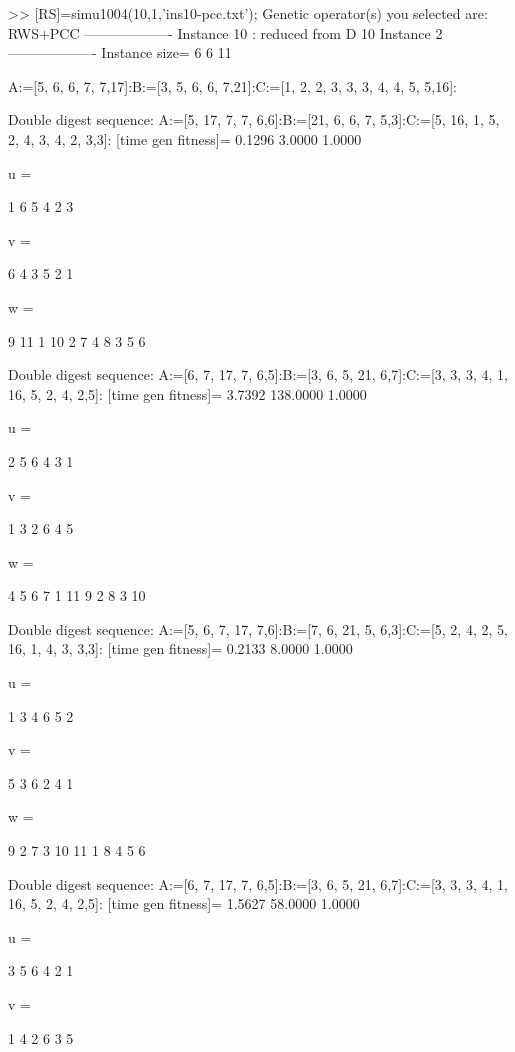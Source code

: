 >> [RS]=simu1004(10,1,'ins10-pcc.txt');
Genetic operator(s) you selected are:
RWS+PCC
------------------- Instance 10 : reduced from D 10 Instance 2 -------------------
Instance size=
     6     6    11

A:=[5, 6, 6, 7, 7,17]:B:=[3, 5, 6, 6, 7,21]:C:=[1, 2, 2, 3, 3, 3, 4, 4, 5, 5,16]:

Double digest sequence:
A:=[5, 17, 7, 7, 6,6]:B:=[21, 6, 6, 7, 5,3]:C:=[5, 16, 1, 5, 2, 4, 3, 4, 2, 3,3]:
[time gen fitness]=
    0.1296    3.0000    1.0000


u =

     1     6     5     4     2     3


v =

     6     4     3     5     2     1


w =

     9    11     1    10     2     7     4     8     3     5     6

Double digest sequence:
A:=[6, 7, 17, 7, 6,5]:B:=[3, 6, 5, 21, 6,7]:C:=[3, 3, 3, 4, 1, 16, 5, 2, 4, 2,5]:
[time gen fitness]=
    3.7392  138.0000    1.0000


u =

     2     5     6     4     3     1


v =

     1     3     2     6     4     5


w =

     4     5     6     7     1    11     9     2     8     3    10

Double digest sequence:
A:=[5, 6, 7, 17, 7,6]:B:=[7, 6, 21, 5, 6,3]:C:=[5, 2, 4, 2, 5, 16, 1, 4, 3, 3,3]:
[time gen fitness]=
    0.2133    8.0000    1.0000


u =

     1     3     4     6     5     2


v =

     5     3     6     2     4     1


w =

     9     2     7     3    10    11     1     8     4     5     6

Double digest sequence:
A:=[6, 7, 17, 7, 6,5]:B:=[3, 6, 5, 21, 6,7]:C:=[3, 3, 3, 4, 1, 16, 5, 2, 4, 2,5]:
[time gen fitness]=
    1.5627   58.0000    1.0000


u =

     3     5     6     4     2     1


v =

     1     4     2     6     3     5


